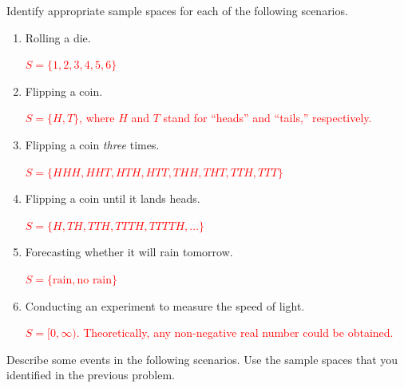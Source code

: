 \documentclass[12pt,reqno]{amsart}
\begin{document}
\prob Identify appropriate sample spaces for each of the following scenarios.

\medskip
\begin{enumerate}
\item Rolling a die.
    
\medskip
\textcolor{red}{$S = \{1,2,3,4,5,6\}$}
\bigskip

\item Flipping a coin.
    
\medskip
\textcolor{red}{$S = \{H,T\}$, where $H$ and $T$ stand for ``heads'' and ``tails,'' respectively.}
\bigskip

\item Flipping a coin \textit{three} times.
    
\medskip
\textcolor{red}{$S = \{HHH, HHT, HTH, HTT, THH, THT, TTH, TTT \}$}
\bigskip

\item Flipping a coin until it lands heads.
    
\medskip
\textcolor{red}{$S = \{H, TH, TTH, TTTH, TTTTH, \ldots\}$}
\bigskip

\item Forecasting whether it will rain tomorrow.
    
\medskip
\textcolor{red}{$S = \{\text{rain}, \text{no rain}\}$}
\bigskip

\item Conducting an experiment to measure the speed of light.
    
\medskip
\textcolor{red}{$S = [0,\infty)$. Theoretically, any non-negative real number could be obtained.}
\end{enumerate}











\bigskip
\prob Describe some events in the following scenarios. Use the sample spaces that you identified in the previous problem.
\end{document}
